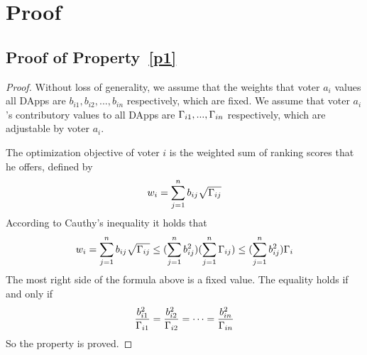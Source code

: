 \section{Proof}
\subsection{Proof of Property~\ref{p1}}
\label{subsection:proof1}
\begin{proof}
	Without loss of generality, we assume that the weights that voter $a_i$ values all DApps are $b_{i1}, b_{i2}, ..., b_{in}$ respectively, which are fixed. We assume that voter $a_i$'s contributory values to all DApps are $\Gamma_{i1},...,\Gamma_{in}$ respectively, which are adjustable by voter $a_i$.
	
	The optimization objective of voter $i$ is the weighted sum of ranking scores that he offers, defined by
	$$w_i = \sum_{j=1}^n b_{ij}\sqrt{\Gamma_{ij}}$$
	According to Cauthy's inequality it holds that
	$$w_i = \sum_{j=1}^n b_{ij}\sqrt{\Gamma_{ij}} \leq (\sum_{j=1}^n b_{ij}^2)(\sum_{j=1}^n \Gamma_{ij}) \leq (\sum_{j=1}^n b_{ij}^2)\Gamma_i$$
	The most right side of the formula	above is a fixed value. The equality holds if and only if
	$$\frac{b_{i1}^2}{\Gamma_{i1}}=\frac{b_{i2}^2}{\Gamma_{i2}}=\cdots=\frac{b_{in}^2}{\Gamma_{in}}$$
	So the property is proved.
\end{proof}

